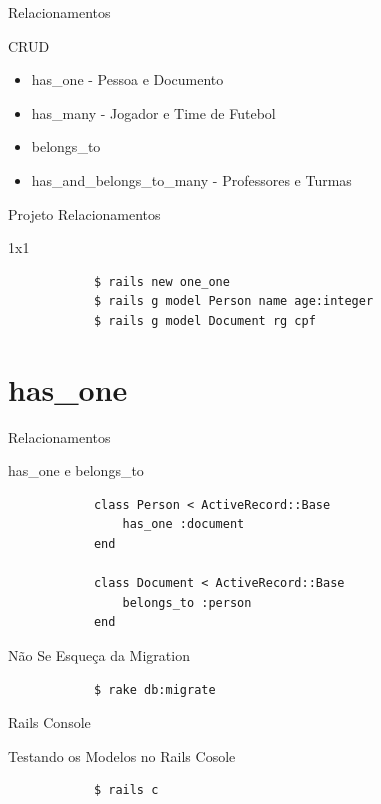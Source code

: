 \documentclass{beamer}
\begin{document}
\begin{frame}{Relacionamentos}
	\begin{block} {\LARGE CRUD}
		\begin{itemize} \itemsep 2em
			\item{\LARGE has\_one - Pessoa e Documento}
			\item{\LARGE has\_many - Jogador e Time de Futebol}
			\item{\LARGE belongs\_to}
			\item{\LARGE has\_and\_belongs\_to\_many - Professores e Turmas}				
		\end{itemize}
	\end{block}
\end{frame}

\begin{frame}[fragile]{Projeto Relacionamentos}
	\begin{block} {1x1}
		\begin{verbatim}
		  	$ rails new one_one
		  	$ rails g model Person name age:integer
		  	$ rails g model Document rg cpf
		\end{verbatim}
	\end{block}
\end{frame}
\section{has\_one}
\begin{frame}[fragile]{Relacionamentos}
	\begin{block} {\LARGE has\_one e belongs\_to}
		\begin{verbatim}
		  	class Person < ActiveRecord::Base
		  	    has_one :document
		  	end
		  	
		  	class Document < ActiveRecord::Base
		  	    belongs_to :person
		  	end
		\end{verbatim}
	\end{block}
\end{frame}

\begin{frame}[fragile]{Não Se Esqueça da Migration}
	\begin{block} {
	}
		\begin{verbatim}
		  	$ rake db:migrate
		\end{verbatim}
	\end{block}
\end{frame}

\begin{frame}[fragile]{Rails Console}
	\begin{block} {\LARGE Testando os Modelos no Rails Cosole}
		\begin{verbatim}
			$ rails c
		\end{verbatim}
	\end{block}
\end{frame}
\end{document}
